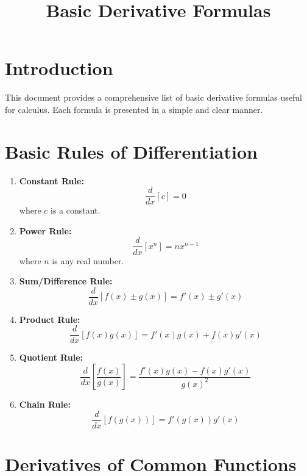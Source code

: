 \documentclass[a4paper,12pt]{article}
\title{Basic Derivative Formulas}
\author{}
\date{}
\begin{document}
\maketitle

\section*{Introduction}
This document provides a comprehensive list of basic derivative formulas useful for calculus. Each formula is presented in a simple and clear manner.

\section*{Basic Rules of Differentiation}

\begin{enumerate}
    \item \textbf{Constant Rule:} 
    \[ \frac{d}{dx}[c] = 0 \]
    where \( c \) is a constant.

    \item \textbf{Power Rule:} 
    \[ \frac{d}{dx}[x^n] = nx^{n-1} \]
    where \( n \) is any real number.

    \item \textbf{Sum/Difference Rule:} 
    \[ \frac{d}{dx}[f(x) \pm g(x)] = f'(x) \pm g'(x) \]

    \item \textbf{Product Rule:} 
    \[ \frac{d}{dx}[f(x)g(x)] = f'(x)g(x) + f(x)g'(x) \]

    \item \textbf{Quotient Rule:} 
    \[ \frac{d}{dx}\left[\frac{f(x)}{g(x)}\right] = \frac{f'(x)g(x) - f(x)g'(x)}{g(x)^2} \]

    \item \textbf{Chain Rule:} 
    \[ \frac{d}{dx}[f(g(x))] = f'(g(x))g'(x) \]
\end{enumerate}

\section*{Derivatives of Common Functions}
\end{document}
